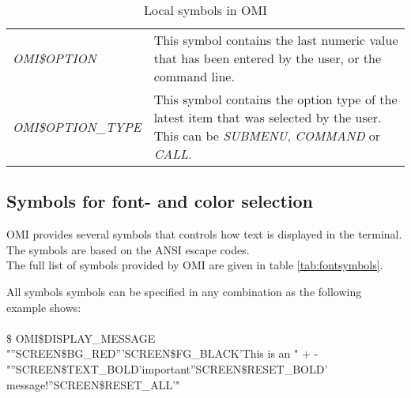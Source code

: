 \documentclass[a4paper]{book}
\newcommand{\vs}{\vspace{3mm}}
\begin{document}
\begin{table}[h!tb]
\begin{minipage}[h!tb]{\textwidth}
\begin{tabular}{lp{9cm}}
\textsl{OMI{\$}OPTION}\index{OMI{\$}OPTION}\index{OMI symbols!local symbols!OMI{\$}OPTION} & 
This symbol contains the last numeric value that has been entered 
by the user, or the command line. \\
\textsl{OMI{\$}OPTION\_TYPE}\index{OMI{\$}OPTION\_TYPE}\index{OMI symbols!local symbols!OMI{\$}OPTION\_TYPE} & 
This symbol contains the option type of the latest item that was selected by
the user. This can be \textsl{SUBMENU}, \textsl{COMMAND} or \textsl{CALL}. \\
\hline
\end{tabular}
\caption{Local symbols in OMI}\label{tab:locsymbols}
\end{minipage}
\end{table}

\subsection{Symbols for font- and color selection}\label{subsection:fontcolors}

OMI provides several symbols that controls how text is displayed in the terminal. The symbols are based on the ANSI escape codes. \\
The full list of symbols provided by OMI are given in table \ref{tab:fontsymbols}.

\vs

All symbols symbols can be specified in any combination as the following example shows:\\
\\
\textsf{\scriptsize{{\$} OMI{\$}DISPLAY{\_}MESSAGE "''SCREEN{\$}BG{\_}RED'''SCREEN{\$}FG{\_}BLACK'This is an " + - \\ \hspace*{5mm}"''SCREEN{\$}TEXT{\_}BOLD'important''SCREEN{\$}RESET{\_}BOLD' message!''SCREEN{\$}RESET{\_}ALL'"}}
\end{document}
